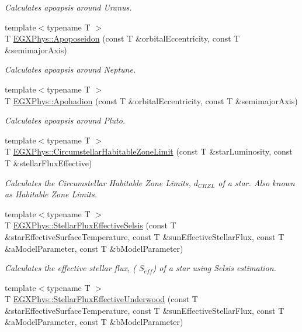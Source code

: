 \begin{DoxyCompactItemize}
\begin{DoxyCompactList}\small\item\em Calculates apoapsis around Uranus. \end{DoxyCompactList}\item 
{\footnotesize template$<$typename T $>$ }\\T \hyperlink{group___astrophysics_ga89679654fff13176e989536163a27f9d}{E\+G\+X\+Phys\+::\+Apoposeidon} (const T \&orbital\+Eccentricity, const T \&semimajor\+Axis)
\begin{DoxyCompactList}\small\item\em Calculates apoapsis around Neptune. \end{DoxyCompactList}\item 
{\footnotesize template$<$typename T $>$ }\\T \hyperlink{group___astrophysics_gaa16847ddc5763c327067075dcb6a3353}{E\+G\+X\+Phys\+::\+Apohadion} (const T \&orbital\+Eccentricity, const T \&semimajor\+Axis)
\begin{DoxyCompactList}\small\item\em Calculates apoapsis around Pluto. \end{DoxyCompactList}\item 
{\footnotesize template$<$typename T $>$ }\\T \hyperlink{group___astrophysics_ga23a8f602461ea3257e8767b1d455c383}{E\+G\+X\+Phys\+::\+Circumstellar\+Habitable\+Zone\+Limit} (const T \&star\+Luminosity, const T \&stellar\+Flux\+Effective)
\begin{DoxyCompactList}\small\item\em Calculates the Circumstellar Habitable Zone Limits, $d_{CHZL}$ of a star. Also known as Habitable Zone Limits. \end{DoxyCompactList}\item 
{\footnotesize template$<$typename T $>$ }\\T \hyperlink{group___astrophysics_ga3ce3a04fec7b1c8fb66ac54270ce3902}{E\+G\+X\+Phys\+::\+Stellar\+Flux\+Effective\+Selsis} (const T \&star\+Effective\+Surface\+Temperature, const T \&sun\+Effective\+Stellar\+Flux, const T \&a\+Model\+Parameter, const T \&b\+Model\+Parameter)
\begin{DoxyCompactList}\small\item\em Calculates the effective stellar flux, ( $S_{eff}$) of a star using Selsis estimation. \end{DoxyCompactList}\item 
{\footnotesize template$<$typename T $>$ }\\T \hyperlink{group___astrophysics_ga34d1e39bce17904bc6d383f1935c79d6}{E\+G\+X\+Phys\+::\+Stellar\+Flux\+Effective\+Underwood} (const T \&star\+Effective\+Surface\+Temperature, const T \&sun\+Effective\+Stellar\+Flux, const T \&a\+Model\+Parameter, const T \&b\+Model\+Parameter)

\end{DoxyCompactItemize}
